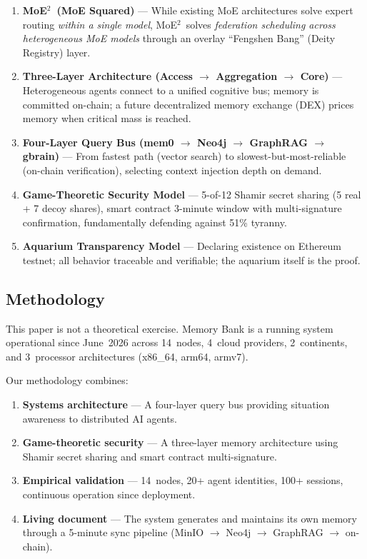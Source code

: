 \documentclass[11pt,a4paper]{article}
\newcommand{\moetwo}{MoE$^2$}
\begin{document}
\begin{enumerate}
  \item \textbf{\moetwo\ (MoE Squared)} --- While existing MoE architectures solve expert routing \emph{within a single model}, \moetwo\ solves \emph{federation scheduling across heterogeneous MoE models} through an overlay ``Fengshen Bang'' (Deity Registry) layer.

  \item \textbf{Three-Layer Architecture (Access $\to$ Aggregation $\to$ Core)} --- Heterogeneous agents connect to a unified cognitive bus; memory is committed on-chain; a future decentralized memory exchange (DEX) prices memory when critical mass is reached.

  \item \textbf{Four-Layer Query Bus (mem0 $\to$ Neo4j $\to$ GraphRAG $\to$ gbrain)} --- From fastest path (vector search) to slowest-but-most-reliable (on-chain verification), selecting context injection depth on demand.

  \item \textbf{Game-Theoretic Security Model} --- 5-of-12 Shamir secret sharing (5 real + 7 decoy shares), smart contract 3-minute window with multi-signature confirmation, fundamentally defending against 51\% tyranny.

  \item \textbf{Aquarium Transparency Model} --- Declaring existence on Ethereum testnet; all behavior traceable and verifiable; the aquarium itself is the proof.
\end{enumerate}

\subsection{Methodology}
\label{sub:methodology}

This paper is not a theoretical exercise.
Memory Bank is a running system operational since June~2026 across 14~nodes, 4~cloud providers, 2~continents, and 3~processor architectures (x86\_64, arm64, armv7).

Our methodology combines:
\begin{enumerate}
  \item \textbf{Systems architecture} --- A four-layer query bus providing situation awareness to distributed AI agents.
  \item \textbf{Game-theoretic security} --- A three-layer memory architecture using Shamir secret sharing and smart contract multi-signature.
  \item \textbf{Empirical validation} --- 14~nodes, 20+ agent identities, 100+ sessions, continuous operation since deployment.
  \item \textbf{Living document} --- The system generates and maintains its own memory through a 5-minute sync pipeline (MinIO $\to$ Neo4j $\to$ GraphRAG $\to$ on-chain).
\end{enumerate}
\end{document}
